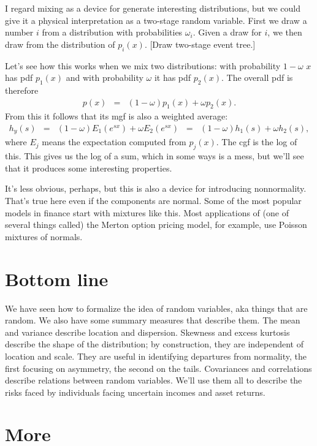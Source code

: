 \documentclass[11pt]{article}
\begin{document}
I regard mixing as a device for generate interesting distributions,
but we could give it a physical interpretation as a two-stage random variable.
First we draw a number $i$ from a distribution with probabilities $\omega_i$.
Given a draw for $i$, we then draw from the distribution of $p_i(x)$.
[Draw two-stage event tree.]

Let's see how this works when we mix two distributions:
with probability $1-\omega$ $x$ has pdf $p_1(x)$
and with probability $\omega$ it has pdf $p_2(x)$.
The overall pdf is therefore
\begin{eqnarray*}
    p (x) &=& (1-\omega) p_1(x) + \omega p_2 (x) .
\end{eqnarray*}
From this it follows that its mgf is also a weighted average:
\begin{eqnarray*}
    h_y(s) &=& (1-\omega) E_1 \left( e^{sx} \right)
                + \omega  E_2 \left( e^{sx} \right)
            \;\;=\;\; (1-\omega) h_1(s) + \omega h_2 (s) ,
\end{eqnarray*}
where $E_j$ means the expectation computed from $p_j(x)$.
The cgf is the log of this.
This gives us the log of a sum, which in some ways is a mess,
but we'll see that it produces some interesting properties.

It's less obvious, perhaps, but this is also a device for introducing nonnormality.
That's true here even if the components are normal.
Some of the most popular models in finance start with mixtures like this.
Most applications of (one of several things called) the Merton option pricing model,
for example, use Poisson mixtures of normals.


\section*{Bottom line}

We have seen how to formalize the idea of random variables,
aka things that are random.
We also have some summary measures that describe them.
The mean and variance describe location and dispersion.
Skewness and excess kurtosis describe the shape of the distribution;
by construction, they are independent of location and scale.
They are useful in identifying departures from normality,
the first focusing on asymmetry, the second on the tails.
Covariances and correlations describe relations between random variables.
We'll use them all to describe the risks faced by individuals
facing uncertain incomes and asset returns.


\section*{More}
\end{document}
